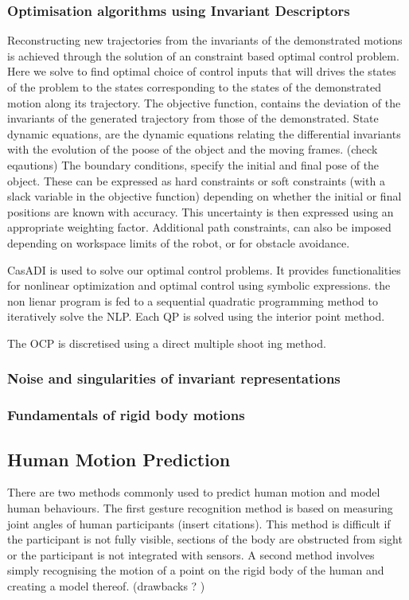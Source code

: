 \documentclass{article}
\begin{document}
\subsubsection{Optimisation algorithms using Invariant Descriptors}
Reconstructing new trajectories from the invariants of the demonstrated motions is achieved through the solution of an constraint based optimal control problem. Here we solve to find optimal choice of control inputs that will drives the states of the problem to the states corresponding to the states of the demonstrated motion along its trajectory. 
The objective function, contains the deviation of the invariants of the generated trajectory from those of the demonstrated. 
State dynamic equations, are the dynamic equations relating the differential invariants with the evolution of the poose of the object and the moving frames. (check eqautions) 
The boundary conditions, specify the initial and final pose of the object. These can be expressed as hard constraints or soft constraints (with a slack variable in the objective function) depending on whether the initial or final positions are known with accuracy. This uncertainty is then expressed using an appropriate weighting factor. 
Additional path constraints, can also be imposed depending on workspace limits of the robot, or for obstacle avoidance.

CasADI is used to solve our optimal control problems. It provides functionalities for nonlinear optimization  and optimal control using symbolic expressions. the non lienar program is fed to a sequential quadratic programming method to iteratively solve the NLP. Each QP is solved using the interior point method. 

The OCP is discretised using a direct multiple shoot ing method. 

\subsubsection{Noise and singularities of invariant representations}
\subsubsection{Fundamentals of rigid body motions}

\subsection{Human Motion Prediction}
There are two methods commonly used to predict human motion and model human behaviours. The first gesture recognition method is based on measuring joint angles of human participants (insert citations). 
This method is difficult if the participant is not fully visible, sections of the body are obstructed from sight or the participant is not integrated with sensors. 
A second method involves simply recognising the motion of a point on the rigid body of the human and creating a model thereof. (drawbacks ? )
\end{document}
